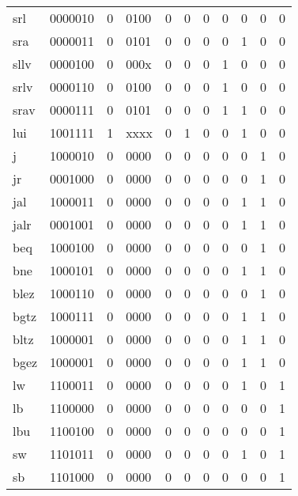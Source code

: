 \documentclass[10pt]{article}
\begin{document}
\begin{center}
\begin{tabular}{|lllllllllll|}
srl & \multicolumn{1}{l|}{0000010} & 0 & 0100 & 0 & 0 & 0 & 0 & 0 & 0 & 0 \\
sra & \multicolumn{1}{l|}{0000011} & 0 & 0101 & 0 & 0 & 0 & 0 & 1 & 0 & 0 \\
sllv & \multicolumn{1}{l|}{0000100} & 0 & 000x & 0 & 0 & 0 & 1 & 0 & 0 & 0 \\
srlv & \multicolumn{1}{l|}{0000110} & 0 & 0100 & 0 & 0 & 0 & 1 & 0 & 0 & 0 \\
srav & \multicolumn{1}{l|}{0000111} & 0 & 0101 & 0 & 0 & 0 & 1 & 1 & 0 & 0 \\
lui & \multicolumn{1}{l|}{1001111} & 1 & xxxx & 0 & 1 & 0 & 0 & 1 & 0 & 0 \\
j & \multicolumn{1}{l|}{1000010} & 0 & 0000 & 0 & 0 & 0 & 0 & 0 & 1 & 0 \\
jr & \multicolumn{1}{l|}{0001000} & 0 & 0000 & 0 & 0 & 0 & 0 & 0 & 1 & 0 \\
jal & \multicolumn{1}{l|}{1000011} & 0 & 0000 & 0 & 0 & 0 & 0 & 1 & 1 & 0 \\
jalr & \multicolumn{1}{l|}{0001001} & 0 & 0000 & 0 & 0 & 0 & 0 & 1 & 1 & 0 \\
beq & \multicolumn{1}{l|}{1000100} & 0 & 0000 & 0 & 0 & 0 & 0 & 0 & 1 & 0 \\
bne & \multicolumn{1}{l|}{1000101} & 0 & 0000 & 0 & 0 & 0 & 0 & 1 & 1 & 0 \\
blez & \multicolumn{1}{l|}{1000110} & 0 & 0000 & 0 & 0 & 0 & 0 & 0 & 1 & 0 \\
bgtz & \multicolumn{1}{l|}{1000111} & 0 & 0000 & 0 & 0 & 0 & 0 & 1 & 1 & 0 \\
bltz & \multicolumn{1}{l|}{1000001} & 0 & 0000 & 0 & 0 & 0 & 0 & 1 & 1 & 0 \\
bgez & \multicolumn{1}{l|}{1000001} & 0 & 0000 & 0 & 0 & 0 & 0 & 1 & 1 & 0 \\
lw & \multicolumn{1}{l|}{1100011} & 0 & 0000 & 0 & 0 & 0 & 0 & 1 & 0 & 1 \\
lb & \multicolumn{1}{l|}{1100000} & 0 & 0000 & 0 & 0 & 0 & 0 & 0 & 0 & 1 \\
lbu & \multicolumn{1}{l|}{1100100} & 0 & 0000 & 0 & 0 & 0 & 0 & 0 & 0 & 1 \\
sw & \multicolumn{1}{l|}{1101011} & 0 & 0000 & 0 & 0 & 0 & 0 & 1 & 0 & 1 \\
sb & \multicolumn{1}{l|}{1101000} & 0 & 0000 & 0 & 0 & 0 & 0 & 0 & 0 & 1 \\ \hline
\end{tabular}
\end{center}
\end{document}
